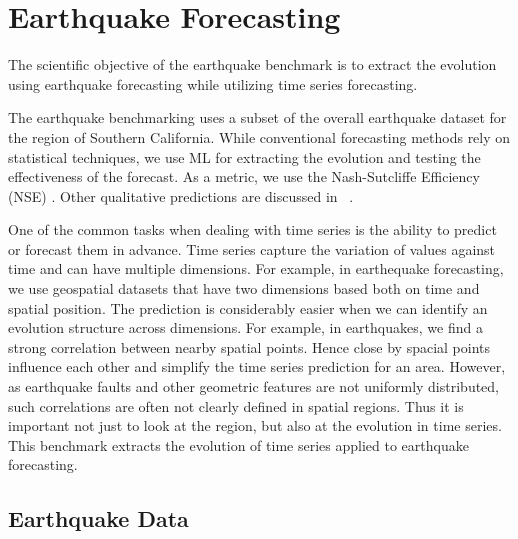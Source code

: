 \section{Earthquake Forecasting}

The scientific objective of the earthquake benchmark is to extract the
evolution using earthquake forecasting while utilizing time series forecasting.

The earthquake benchmarking uses a subset of the overall earthquake
dataset for the region of Southern California. While conventional
forecasting methods rely on statistical techniques, we use ML
for extracting the evolution and testing the effectiveness of the
forecast.  As a metric, we use the Nash-Sutcliffe Efficiency (NSE)
\cite{nash-79}.  Other qualitative predictions are discussed in
~\cite{fox2022-jm}.

One of the common tasks when dealing with time series is the ability
to predict or forecast them in advance.  Time series capture the
variation of values against time and can have multiple dimensions. For
example, in earthequake forecasting, we use geospatial datasets that have
two dimensions based both on time and spatial position. The prediction
is considerably easier when we can identify an evolution structure
across dimensions. For example, in earthquakes, we find a strong
correlation between nearby spatial points. Hence close by spacial
points influence each other and simplify the time series prediction
for an area.  However, as earthquake faults and other geometric features
are not uniformly distributed, such correlations are often not clearly
defined in spatial regions. Thus it is important not just to look at
the region, but also at the evolution in time series. This benchmark
extracts the evolution of time series applied to earthquake forecasting.


\subsection{Earthquake Data}

